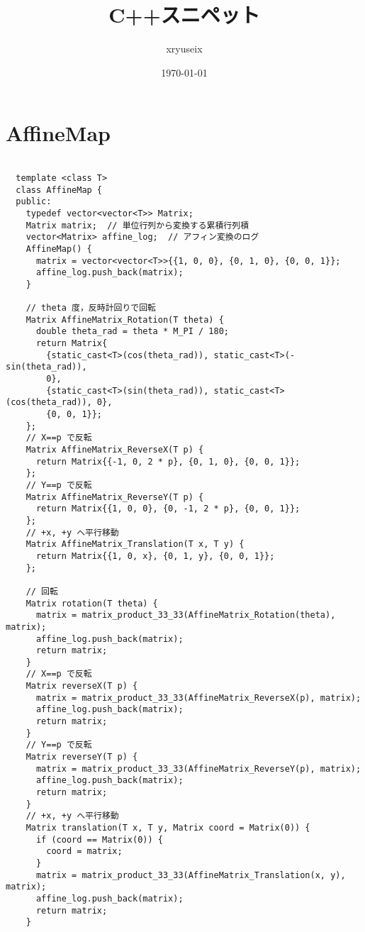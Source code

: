 \documentclass{jsarticle}
\title{C++スニペット}
\author{xryuseix}
\date{\today}
\begin{document}
\maketitle

\tableofcontents %
\clearpage



\color{white}
\section{AffineMap}
\color{black}
\begin{lstlisting}[caption=AffineMap]

  template <class T>
  class AffineMap {
  public:
    typedef vector<vector<T>> Matrix;
    Matrix matrix;  // 単位行列から変換する累積行列積
    vector<Matrix> affine_log;  // アフィン変換のログ
    AffineMap() {
      matrix = vector<vector<T>>{{1, 0, 0}, {0, 1, 0}, {0, 0, 1}};
      affine_log.push_back(matrix);
    }
  
    // theta 度，反時計回りで回転
    Matrix AffineMatrix_Rotation(T theta) {
      double theta_rad = theta * M_PI / 180;
      return Matrix{
        {static_cast<T>(cos(theta_rad)), static_cast<T>(-sin(theta_rad)),
        0},
        {static_cast<T>(sin(theta_rad)), static_cast<T>(cos(theta_rad)), 0},
        {0, 0, 1}};
    };
    // X==p で反転
    Matrix AffineMatrix_ReverseX(T p) {
      return Matrix{{-1, 0, 2 * p}, {0, 1, 0}, {0, 0, 1}};
    };
    // Y==p で反転
    Matrix AffineMatrix_ReverseY(T p) {
      return Matrix{{1, 0, 0}, {0, -1, 2 * p}, {0, 0, 1}};
    };
    // +x, +y へ平行移動
    Matrix AffineMatrix_Translation(T x, T y) {
      return Matrix{{1, 0, x}, {0, 1, y}, {0, 0, 1}};
    };
  
    // 回転
    Matrix rotation(T theta) {
      matrix = matrix_product_33_33(AffineMatrix_Rotation(theta), matrix);
      affine_log.push_back(matrix);
      return matrix;
    }
    // X==p で反転
    Matrix reverseX(T p) {
      matrix = matrix_product_33_33(AffineMatrix_ReverseX(p), matrix);
      affine_log.push_back(matrix);
      return matrix;
    }
    // Y==p で反転
    Matrix reverseY(T p) {
      matrix = matrix_product_33_33(AffineMatrix_ReverseY(p), matrix);
      affine_log.push_back(matrix);
      return matrix;
    }
    // +x, +y へ平行移動
    Matrix translation(T x, T y, Matrix coord = Matrix(0)) {
      if (coord == Matrix(0)) {
        coord = matrix;
      }
      matrix = matrix_product_33_33(AffineMatrix_Translation(x, y), matrix);
      affine_log.push_back(matrix);
      return matrix;
    }
  

\end{lstlisting}
\end{document}
